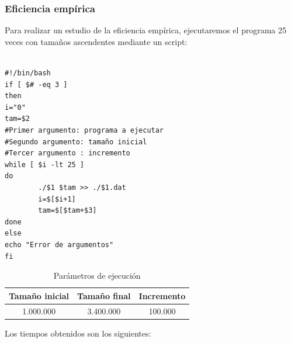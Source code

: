 \documentclass[12pt,spanish]{article}
\begin{document}
\subsubsection{Eficiencia empírica}

Para realizar un estudio de la eficiencia empírica, ejecutaremos el programa 25 veces con tamaños ascendentes mediante un script:

\begin{verbatim}

#!/bin/bash                                                                     
if [ $# -eq 3 ]
then
i="0"
tam=$2
#Primer argumento: programa a ejecutar                                          
#Segundo argumento: tamaño inicial                                              
#Tercer argumento : incremento                                                  
while [ $i -lt 25 ]
do
        ./$1 $tam >> ./$1.dat
        i=$[$i+1]
        tam=$[$tam+$3]
done
else
echo "Error de argumentos"
fi

\end{verbatim}

\begin{table}[H]
\centering
\begin{tabular}{|c|c|c|}
\hline
\textbf{Tamaño inicial} & \textbf{Tamaño final} & \textbf{Incremento} \\
\hline
1.000.000 & 3.400.000 &100.000 \\
\hline
\end{tabular}
\caption{Parámetros de ejecución}
\end{table}

Los tiempos obtenidos son los siguientes:
\end{document}
